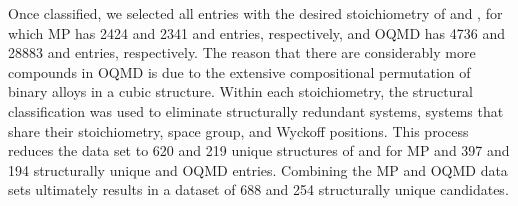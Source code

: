 %
%
Once classified, we selected all entries with the desired stoichiometry of \ABtwo and \ABthree,
for which MP has \num{2424} and \num{2341} \ABtwo and \ABthree entries, respectively,
and OQMD has \num{4736} and \num{28883} \ABtwo and \ABthree entries, respectively.
%
The reason that there are considerably more \ABthree compounds in OQMD is due to the extensive compositional permutation of binary alloys in a cubic \ABthree structure.
%
Within each stoichiometry, the structural classification was used to eliminate structurally redundant systems,
 systems that share their stoichiometry, space group, and Wyckoff positions.
%
This process reduces the data set to \num{620} and \num{219} unique structures of \ABtwo and \ABthree for MP and \num{397} and \num{194} structurally unique \ABtwo and \ABthree OQMD entries.
%
Combining the MP and OQMD data sets ultimately results in a dataset of \num{688} \ABtwo and \num{254} \ABthree structurally unique candidates.


